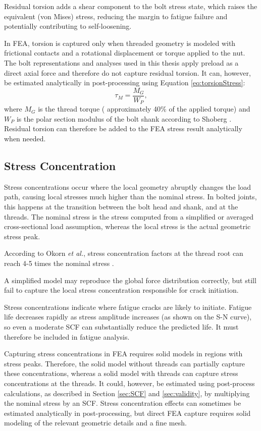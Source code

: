 \documentclass[a4paper,twoside]{bth}
\begin{document}
Residual torsion adds a shear component to the bolt stress state, which raises the equivalent (von Mises) stress, reducing the margin to fatigue failure and potentially contributing to self-loosening.

In \ac{FEA},  torsion is captured only when threaded geometry is modeled with frictional contacts and a rotational displacement or torque applied to the nut. The bolt representations and analyses used in this thesis apply preload as a direct axial force and therefore do not capture residual torsion. It can, however, be estimated analytically in post-processing using Equation \ref{eq:torsionStress}:
\begin{equation} \label{eq:torsionStress}
    \tau_M = \frac{M_G}{W_P},
\end{equation}
where $M_G$ is the thread torque ( approximately 40\% of the applied torque) and $W_P$ is the polar section modulus of the bolt shank according to Shoberg \cite{VDI_Fundamentals}. Residual torsion can therefore be added to the \ac{FEA} stress result analytically when needed.

\subsection{Stress Concentration}
Stress concentrations occur where the local geometry abruptly changes the load path, causing local stresses much higher than the nominal stress. In bolted joints, this happens at the transition between the bolt head and shank, and at the threads. The nominal stress is the stress computed from a simplified or averaged cross-sectional load assumption, whereas the local stress is the actual geometric stress peak.

According to Okorn \textit{et al.}, stress concentration factors at the thread root can reach 4-5 times the nominal stress \cite{30}.

A simplified model may reproduce the global force distribution correctly, but still fail to capture the local stress concentration responsible for crack initiation.

Stress concentrations indicate where fatigue cracks are likely to initiate. Fatigue life decreases rapidly as stress amplitude increases (as shown on the S-N curve), so even a moderate \ac{SCF} can substantially reduce the predicted life. It must therefore be included in fatigue analysis.

Capturing stress concentrations in \ac{FEA} requires solid models in regions with stress peaks. Therefore, the solid model without threads can partially capture these concentrations, whereas a solid model with threads can capture stress concentrations at the threads. It could, however, be estimated using post-process calculations, as described in Section \ref{sec:SCF} and \ref{sec:validity}, by multiplying the nominal stress by an \ac{SCF}. Stress concentration effects can sometimes be estimated analytically in post-processing, but direct \ac{FEA} capture requires solid modeling of the relevant geometric details and a fine mesh.
\end{document}
